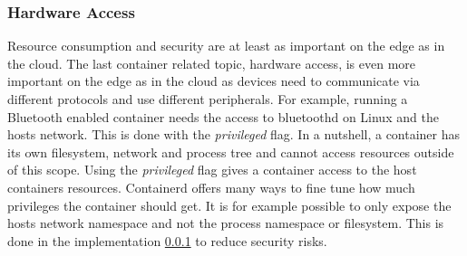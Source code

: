 \subsubsection{Hardware Access}
Resource consumption and security are at least as important on the edge as in the cloud. The last container related topic, hardware access, is even more important on the edge as in the cloud as devices need to communicate via different protocols and use different peripherals. For example, running a Bluetooth enabled container needs the access to bluetoothd on Linux and the hosts network. This is done with the \textit{privileged} flag. In a nutshell, a container has its own filesystem, network and process tree and cannot access resources outside of this scope. Using the \textit{privileged} flag gives a container access to the host containers resources. Containerd offers many ways to fine tune how much privileges the container should get. It is for example possible to only expose the hosts network namespace and not the process namespace or filesystem. This is done in the implementation \cref{} \nameref{} to reduce security risks.